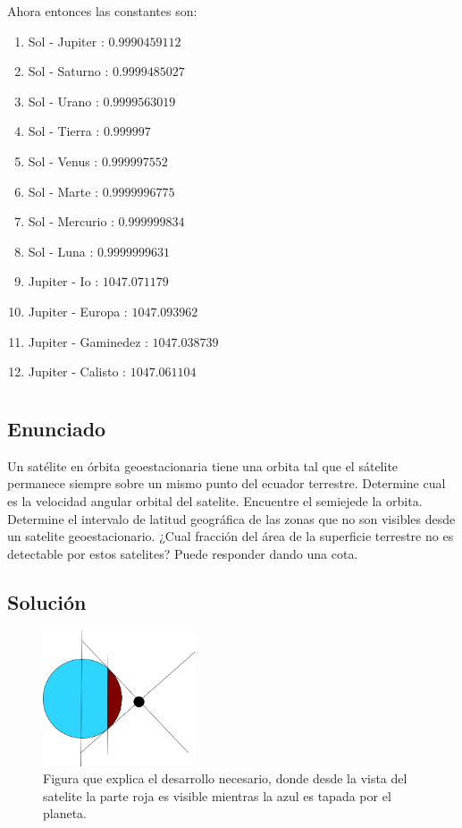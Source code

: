 \documentclass{report}
\begin{document}
\begin{enumerate}
   Ahora entonces las constantes son:
   \begin{enumerate}
     \item Sol - Jupiter : $0.9990459112$ 
     \item Sol - Saturno : $0.9999485027$ 
     \item Sol - Urano : $0.9999563019$ 
     \item Sol - Tierra : $0.999997$ 
     \item Sol - Venus : $0.999997552$ 
     \item Sol - Marte : $0.9999996775$ 
     \item Sol - Mercurio : $0.999999834$ 
     \item Sol - Luna : $0.9999999631$ 
     \item Jupiter - Io : $1047.071179$ 
     \item Jupiter - Europa : $1047.093962$ 
     \item Jupiter - Gaminedez : $1047.038739$ 
     \item Jupiter - Calisto : $1047.061104$
   \end{enumerate}
\end{enumerate}


\chapter{}

\section{Enunciado}
Un satélite en órbita geoestacionaria tiene una orbita tal que el sátelite permanece siempre sobre un mismo punto del ecuador terrestre. Determine cual es la velocidad angular orbital del satelite. Encuentre el semiejede la orbita. Determine el intervalo de latitud geográfica de las zonas que no son visibles desde un satelite geoestacionario. ¿Cual fracción del área de la superficie terrestre no es detectable por estos satelites? Puede responder dando una cota.

\section{Solución}

\begin{figure}[H]
  \centering
  \includegraphics[width=0.4\textwidth]{img/fig31.png}
  \caption{Figura que explica el desarrollo necesario, donde desde la vista del satelite la parte roja es visible mientras la azul es tapada por el planeta.}
  \label{img:31}
\end{figure}
\end{document}

